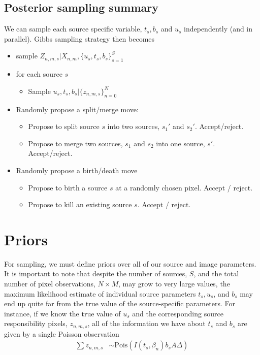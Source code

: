 \documentclass[11pt]{article}
\begin{document}
\subsection{Posterior sampling summary}

We can sample each source specific variable, $t_s, b_s$ and $u_s$ independently (and in parallel).  Gibbs sampling strategy then becomes
\begin{itemize}
\item sample $Z_{n,m,s} | X_{n,m}, \{u_s, t_s, b_s\}_{s=1}^S$
\item for each source $s$
  \begin{itemize}
  \item Sample $u_s, t_s, b_s | \{z_{n,m,s}\}_{n=0}^N$
  \end{itemize}
\item Randomly propose a split/merge move: 
  \begin{itemize}
  \item Propose to split source $s$ into two sources, $s_1'$ and $s_2'$.  Accept/reject.
  \item Propose to merge two sources, $s_1$ and $s_2$ into one source, $s'$.  Accept/reject. 
  \end{itemize}
  
\item Randomly propose a birth/death move
  \begin{itemize}
  \item  Propose to birth a source $s$ at a randomly chosen pixel. Accept / reject.
  \item Propose to kill an existing source $s$. Accept / reject.
  \end{itemize}
\end{itemize}

\section{Priors}
For sampling, we must define priors over all of our source and image parameters.  It is important to note that despite the number of sources, $S$, and the total number of pixel observations, $N \times M$, may grow to very large values, the maximum likelihood estimate of individual source parameters $t_s, u_s$, and $b_s$ may end up quite far from the true value of the source-specific parameters.  For instance, if we know the true value of $u_s$ and the corresponding source responsibility pixels, $z_{n,m,s}$, all of the information we have about $t_s$ and $b_s$ are given by a single Poisson observation 
\begin{align}
  \sum z_{n,m,s} &\sim \textrm{Pois}\left( I(t_s, \beta_n) b_s A \Delta \right) 
\end{align}
\end{document}
